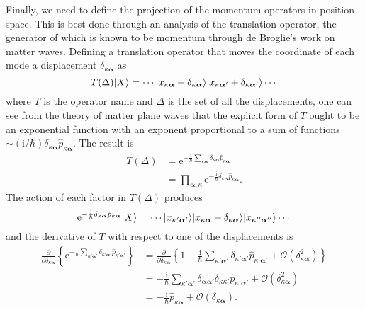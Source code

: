 \documentclass{article}
\numberwithin{equation}{section}
\begin{document}
Finally, we need to define the projection of the momentum operators in position space. This is best done through an analysis of the translation operator, the generator of which is known to be momentum through de Broglie's work on matter waves. Defining a translation operator that moves the coordinate of each mode a displacement $\delta_{\kappa\bm{\alpha}}$ as 
\begin{equation}
T(\Delta)|{X}\rangle = \cdots|{x_{\kappa\bm{\alpha}} + \delta_{\kappa\bm{\alpha}}}\rangle|{x_{\kappa\bm{\alpha}'} + \delta_{\kappa\bm{\alpha}'}}\rangle\cdots
\end{equation}
where $T$ is the operator name and $\Delta$ is the set of all the displacements, one can see from the theory of matter plane waves that the explicit form of $T$ ought to be an exponential function with an exponent proportional to a sum of functions $\sim(\mathrm{i}/\hbar)\delta_{\kappa\bm{\alpha}}\hat{p}_{\kappa\bm{\alpha}}$. The result is
\begin{equation}
\begin{split}
T(\Delta) &= \mathrm{e}^{-\frac{\mathrm{i}}{\hbar}\sum_{\kappa\bm{\alpha}}\delta_{\kappa\bm{\alpha}}\hat{p}_{\kappa\bm{\alpha}}}\\
&= \prod_{\bm{\alpha},\kappa}\mathrm{e}^{-\frac{\mathrm{i}}{\hbar}\delta_{\kappa\bm{\alpha}}\hat{p}_{\kappa\bm{\alpha}}}.
\end{split}
\end{equation}
The action of each factor in $T(\Delta)$ produces
\begin{equation}
\mathrm{e}^{-\frac{\mathrm{i}}{\hbar}\delta_{\kappa\bm{\alpha}}\hat{p}_{\kappa\bm{\alpha}}}|{X}\rangle = \cdots|{x_{\kappa'\bm{\alpha}'}}\rangle|{x_{\kappa\bm{\alpha}} + \delta_{\kappa\bm{\alpha}}}\rangle|{x_{\kappa''\bm{\alpha}''}}\rangle\cdots
\end{equation}
and the derivative of $T$ with respect to one of the displacements is
\begin{equation}
\begin{split}
\frac{\partial}{\partial\delta_{\kappa\bm{\alpha}}}\left\{\mathrm{e}^{-\frac{\mathrm{i}}{\hbar}\sum_{\kappa'\bm{\alpha}'}\delta_{\kappa'\bm{\alpha}'}\hat{p}_{\kappa'\bm{\alpha}'}}\right\} &= \frac{\partial}{\partial\delta_{\kappa\bm{\alpha}}}\left\{1- \frac{\mathrm{i}}{\hbar}\sum_{\kappa'\bm{\alpha}'}\delta_{\kappa'\bm{\alpha}'}\hat{p}_{\kappa'\bm{\alpha}'} + \mathcal{O}\left(\delta_{\kappa\bm{\alpha}}^2\right)\right\}\\
&= -\frac{\mathrm{i}}{\hbar}\sum_{\kappa'\bm{\alpha}'}\delta_{\bm{\alpha}\bm{\alpha}'}\delta_{\kappa\kappa'}\hat{p}_{\kappa'\bm{\alpha}'} + \mathcal{O}\left(\delta^2_{\kappa\bm{\alpha}}\right)\\
&= -\frac{\mathrm{i}}{\hbar}\hat{p}_{\kappa\bm{\alpha}} + \mathcal{O}\left(\delta_{\kappa\bm{\alpha}}\right).
\end{split}
\end{equation}
\end{document}
